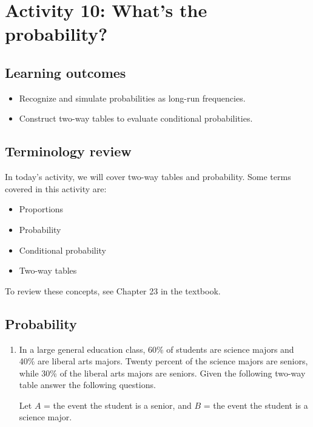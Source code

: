 \documentclass[
]{report}
\begin{document}
\newpage

\hypertarget{activity-10-whats-the-probability}{%
\section{Activity 10: What's the probability?}\label{activity-10-whats-the-probability}}


\hypertarget{learning-outcomes-21}{%
\subsection{Learning outcomes}\label{learning-outcomes-21}}

\begin{itemize}
\item
  Recognize and simulate probabilities as long-run frequencies.
\item
  Construct two-way tables to evaluate conditional probabilities.
\end{itemize}

\hypertarget{terminology-review-18}{%
\subsection{Terminology review}\label{terminology-review-18}}

In today's activity, we will cover two-way tables and probability. Some terms covered in this activity are:

\begin{itemize}
\item
  Proportions
\item
  Probability
\item
  Conditional probability
\item
  Two-way tables
\end{itemize}

To review these concepts, see Chapter 23 in the textbook.

\hypertarget{probability-1}{%
\subsection{Probability}\label{probability-1}}

\begin{enumerate}
\def\labelenumi{\arabic{enumi}.}
\item
  In a large general education class, 60\% of students are science majors and 40\% are liberal arts majors. Twenty percent of the science majors are seniors, while 30\% of the liberal arts majors are seniors. Given the following two-way table answer the following questions.
  \vspace{1mm}

  Let \(A\) = the event the student is a senior, and \(B\) = the event the student is a science major.
  \vspace{0.1in}
\end{enumerate}
\end{document}
